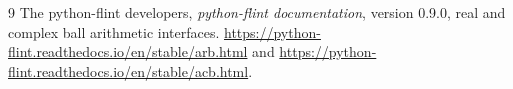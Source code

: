 \documentclass[11pt]{article}
\begin{document}
\begin{thebibliography}{9}
 The python-flint developers, \emph{python-flint documentation}, version 0.9.0, real and complex ball arithmetic interfaces. \url{https://python-flint.readthedocs.io/en/stable/arb.html} and \url{https://python-flint.readthedocs.io/en/stable/acb.html}.
\end{thebibliography}
\end{document}
